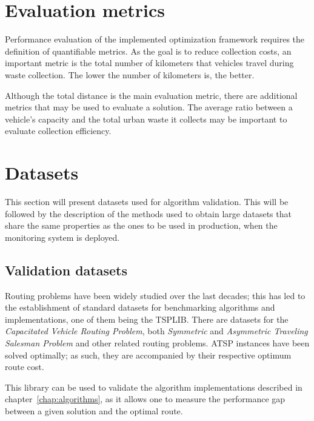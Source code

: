 \section{Evaluation metrics}
\label{section:metrics}

Performance evaluation of the implemented optimization framework requires the
definition of quantifiable metrics. As the goal is to reduce collection costs,
an important metric is the total number of kilometers that vehicles travel
during waste collection. The lower the number of kilometers is, the better.

Although the total distance is the main evaluation metric, there are additional
metrics that may be used to evaluate a solution. The average ratio between a
vehicle's capacity and the total urban waste it collects may be important to
evaluate collection efficiency.





\section{Datasets}
\label{section:datasets}

This section will present datasets used for algorithm validation. This will be
followed by the description of the methods used to obtain large datasets that
share the same properties as the ones to be used in production, when the
monitoring system is deployed.

\subsection{Validation datasets}
\label{section:validation-datasets}

Routing problems have been widely studied over the last decades; this has led
to the establishment of standard datasets for benchmarking algorithms and
implementations, one of them being the TSPLIB\cite{GerhardReinelt01011991}.
There are datasets for the \textit{Capacitated Vehicle Routing Problem}, both
\textit{Symmetric} and \textit{Asymmetric Traveling Salesman Problem} and other
related routing problems. ATSP instances have been solved optimally; as such,
they are accompanied by their respective optimum route cost.

This library can be used to validate the algorithm implementations described in
chapter~\ref{chap:algorithms}, as it allows one to measure the performance gap
between a given solution and the optimal route.


